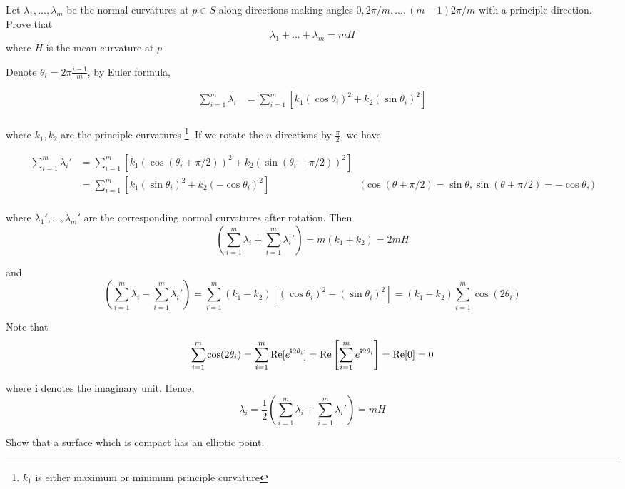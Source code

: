 \documentclass{article}
\begin{document}
\begin{problem}
    Let $\lambda_1, ..., \lambda_m$ be the normal curvatures at $p \in S$ along directions making angles $0, 2\pi/m, ..., (m-1)2\pi/m$ with a principle direction. Prove that
    \[
        \lambda_1 + ... + \lambda_m = mH
    \]
    where $H$ is the mean curvature at $p$
\end{problem}

Denote $\theta_i = 2\pi \frac{i-1}{m}$, by Euler formula,

\begin{align*}
    \sum_{i=1}^m \lambda_i
    &= \sum_{i=1}^m [ k_1 (\cos \theta_i)^2 + k_2 (\sin \theta_i )^2 ] \\
\end{align*}

where $k_1, k_2$ are the principle curvatures \footnote{$k_1$ is either maximum or minimum principle curvature}. If we rotate the $n$ directions by $\frac{\pi}{2}$, we have

\begin{align*}
    \sum_{i=1}^m \lambda_i'
    &= \sum_{i=1}^m [ k_1 (\cos (\theta_i + \pi/2) )^2 + k_2 (\sin (\theta_i + \pi/2) )^2 ] \\
    &= \sum_{i=1}^m [ k_1 (\sin \theta_i )^2 + k_2 (-\cos \theta_i)^2 ] &\text{($\cos (\theta + \pi/2) = \sin \theta, \sin (\theta + \pi/2) = -\cos \theta,$)}\\
\end{align*}

where $\lambda_1', ..., \lambda_m'$ are the corresponding normal curvatures after rotation. Then 
\[
    \left(\sum_{i=1}^m \lambda_i +  \sum_{i=1}^m \lambda_i'\right) = m (k_1 + k_2) = 2mH
\]

and
\[
    \left(\sum_{i=1}^m \lambda_i -  \sum_{i=1}^m \lambda_i'\right) = \sum_{i=1}^m (k_1 - k_2) [(\cos \theta_i)^2 - (\sin \theta_i)^2] = (k_1 - k_2) \sum_{i=1}^m \cos (2 \theta_i)
\]

Note that
\[
    \sum_{i=1}^m \cos (2 \theta_i) = \sum_{i=1}^m \operatorname{Re}[e^{\mathbf{i} 2\theta_i}] = \operatorname{Re}\left[\sum_{i=1}^m e^{\mathbf{i} 2\theta_i} \right] = \operatorname{Re}[0] = 0
\]

where $\mathbf{i}$ denotes the imaginary unit. Hence,
\[
   \lambda_i = \frac{1}{2}  \left(\sum_{i=1}^m \lambda_i +  \sum_{i=1}^m \lambda_i'\right) = mH
\]




\begin{problem}
    Show that a surface which is compact has an elliptic point.
\end{problem}
\end{document}
